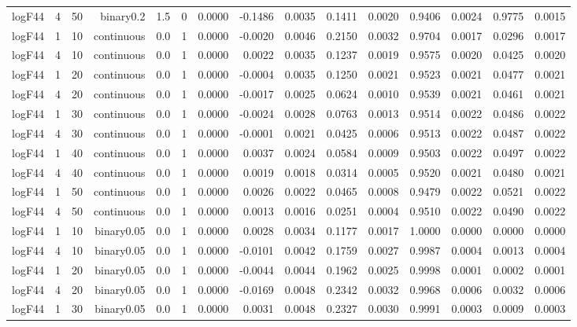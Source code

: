 \begin{longtable}{rrrrrrrrrrrrrrr}
  logF44 & 4 & 50 & binary0.2 & 1.5 & 0 & 0.0000 & -0.1486 & 0.0035 & 0.1411 & 0.0020 & 0.9406 & 0.0024 & 0.9775 & 0.0015 \\ 
  logF44 & 1 & 10 & continuous & 0.0 & 1 & 0.0000 & -0.0020 & 0.0046 & 0.2150 & 0.0032 & 0.9704 & 0.0017 & 0.0296 & 0.0017 \\ 
  logF44 & 4 & 10 & continuous & 0.0 & 1 & 0.0000 & 0.0022 & 0.0035 & 0.1237 & 0.0019 & 0.9575 & 0.0020 & 0.0425 & 0.0020 \\ 
  logF44 & 1 & 20 & continuous & 0.0 & 1 & 0.0000 & -0.0004 & 0.0035 & 0.1250 & 0.0021 & 0.9523 & 0.0021 & 0.0477 & 0.0021 \\ 
  logF44 & 4 & 20 & continuous & 0.0 & 1 & 0.0000 & -0.0017 & 0.0025 & 0.0624 & 0.0010 & 0.9539 & 0.0021 & 0.0461 & 0.0021 \\ 
  logF44 & 1 & 30 & continuous & 0.0 & 1 & 0.0000 & -0.0024 & 0.0028 & 0.0763 & 0.0013 & 0.9514 & 0.0022 & 0.0486 & 0.0022 \\ 
  logF44 & 4 & 30 & continuous & 0.0 & 1 & 0.0000 & -0.0001 & 0.0021 & 0.0425 & 0.0006 & 0.9513 & 0.0022 & 0.0487 & 0.0022 \\ 
  logF44 & 1 & 40 & continuous & 0.0 & 1 & 0.0000 & 0.0037 & 0.0024 & 0.0584 & 0.0009 & 0.9503 & 0.0022 & 0.0497 & 0.0022 \\ 
  logF44 & 4 & 40 & continuous & 0.0 & 1 & 0.0000 & 0.0019 & 0.0018 & 0.0314 & 0.0005 & 0.9520 & 0.0021 & 0.0480 & 0.0021 \\ 
  logF44 & 1 & 50 & continuous & 0.0 & 1 & 0.0000 & 0.0026 & 0.0022 & 0.0465 & 0.0008 & 0.9479 & 0.0022 & 0.0521 & 0.0022 \\ 
  logF44 & 4 & 50 & continuous & 0.0 & 1 & 0.0000 & 0.0013 & 0.0016 & 0.0251 & 0.0004 & 0.9510 & 0.0022 & 0.0490 & 0.0022 \\ 
  logF44 & 1 & 10 & binary0.05 & 0.0 & 1 & 0.0000 & 0.0028 & 0.0034 & 0.1177 & 0.0017 & 1.0000 & 0.0000 & 0.0000 & 0.0000 \\ 
  logF44 & 4 & 10 & binary0.05 & 0.0 & 1 & 0.0000 & -0.0101 & 0.0042 & 0.1759 & 0.0027 & 0.9987 & 0.0004 & 0.0013 & 0.0004 \\ 
  logF44 & 1 & 20 & binary0.05 & 0.0 & 1 & 0.0000 & -0.0044 & 0.0044 & 0.1962 & 0.0025 & 0.9998 & 0.0001 & 0.0002 & 0.0001 \\ 
  logF44 & 4 & 20 & binary0.05 & 0.0 & 1 & 0.0000 & -0.0169 & 0.0048 & 0.2342 & 0.0032 & 0.9968 & 0.0006 & 0.0032 & 0.0006 \\ 
  logF44 & 1 & 30 & binary0.05 & 0.0 & 1 & 0.0000 & 0.0031 & 0.0048 & 0.2327 & 0.0030 & 0.9991 & 0.0003 & 0.0009 & 0.0003 \\ 

\end{longtable}
